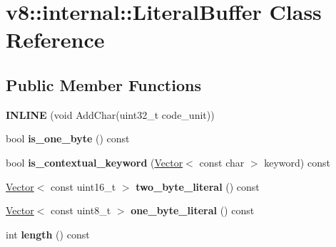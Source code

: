 \hypertarget{classv8_1_1internal_1_1_literal_buffer}{}\section{v8\+:\+:internal\+:\+:Literal\+Buffer Class Reference}
\label{classv8_1_1internal_1_1_literal_buffer}
\subsection*{Public Member Functions}
\begin{DoxyCompactItemize}
\item 
{\bfseries I\+N\+L\+I\+NE} (void Add\+Char(uint32\+\_\+t code\+\_\+unit))\hypertarget{classv8_1_1internal_1_1_literal_buffer_a2f757f671c72173fc62395254e4eb71c}{}\label{classv8_1_1internal_1_1_literal_buffer_a2f757f671c72173fc62395254e4eb71c}

\item 
bool {\bfseries is\+\_\+one\+\_\+byte} () const \hypertarget{classv8_1_1internal_1_1_literal_buffer_a762672132b89b8d81d19543ad5c4f9a6}{}\label{classv8_1_1internal_1_1_literal_buffer_a762672132b89b8d81d19543ad5c4f9a6}

\item 
bool {\bfseries is\+\_\+contextual\+\_\+keyword} (\hyperlink{classv8_1_1internal_1_1_vector}{Vector}$<$ const char $>$ keyword) const \hypertarget{classv8_1_1internal_1_1_literal_buffer_ad9b6e77a0db54a0d24366257423d1ec7}{}\label{classv8_1_1internal_1_1_literal_buffer_ad9b6e77a0db54a0d24366257423d1ec7}

\item 
\hyperlink{classv8_1_1internal_1_1_vector}{Vector}$<$ const uint16\+\_\+t $>$ {\bfseries two\+\_\+byte\+\_\+literal} () const \hypertarget{classv8_1_1internal_1_1_literal_buffer_ace6fbfaafde62a75b345ac453a9e8e68}{}\label{classv8_1_1internal_1_1_literal_buffer_ace6fbfaafde62a75b345ac453a9e8e68}

\item 
\hyperlink{classv8_1_1internal_1_1_vector}{Vector}$<$ const uint8\+\_\+t $>$ {\bfseries one\+\_\+byte\+\_\+literal} () const \hypertarget{classv8_1_1internal_1_1_literal_buffer_a00ed1e85c165b3775d7815c525e509cf}{}\label{classv8_1_1internal_1_1_literal_buffer_a00ed1e85c165b3775d7815c525e509cf}

\item 
int {\bfseries length} () const \hypertarget{classv8_1_1internal_1_1_literal_buffer_a8b12d1e4e4476b70f1cf84ddb150c02c}{}\label{classv8_1_1internal_1_1_literal_buffer_a8b12d1e4e4476b70f1cf84ddb150c02c}


\end{DoxyCompactItemize}
